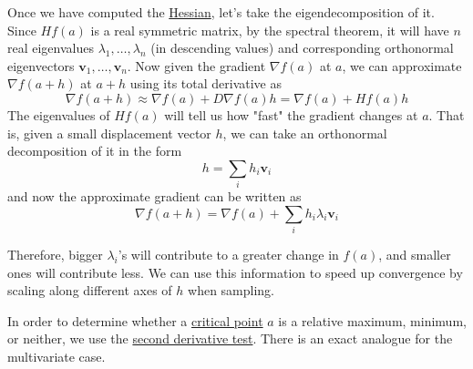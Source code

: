 	Once we have computed the \hyperref[def:hessian]{Hessian}, let's take the eigendecomposition of it. Since $H f(a)$ is a real symmetric matrix, by the spectral theorem, it will have $n$ real eigenvalues $\lambda_1, \ldots, \lambda_n$ (in descending values) and corresponding orthonormal eigenvectors $\mathbf{v}_1, \ldots, \mathbf{v}_n$. Now given the gradient $\nabla f(a)$ at $a$, we can approximate $\nabla f(a + h)$ at $a + h$ using its total derivative as 
	\begin{equation}
  	\nabla f(a + h) \approx \nabla f(a) + D \nabla f(a) h = \nabla f(a) + H f(a) h
	\end{equation}
  The eigenvalues of $H f(a)$ will tell us how "fast" the gradient changes at $a$. That is, given a small displacement vector $h$, we can take an orthonormal decomposition of it in the form 
	\begin{equation}
  	h = \sum_{i} h_i \mathbf{v}_i
	\end{equation}
  and now the approximate gradient can be written as 
	\begin{equation}
  	\nabla f (a + h) = \nabla f(a) + \sum_i h_i \lambda_i \mathbf{v}_i
	\end{equation}

  Therefore, bigger $\lambda_i$'s will contribute to a greater change in $f(a)$, and smaller ones will contribute less. We can use this information to speed up convergence by scaling along different axes of $h$ when sampling. 

	In order to determine whether a \hyperref[real-def:critical-point]{critical point} $a$ is a relative maximum, minimum, or neither, we use the \hyperref[real-thm:second-der-test]{second derivative test}. There is an exact analogue for the multivariate case. 


